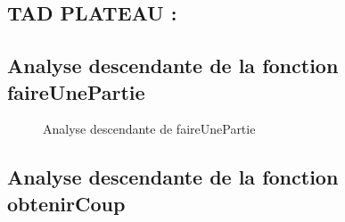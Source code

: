 \documentclass{article}
\begin{document}
\subsection{TAD PLATEAU :}



\subsection{Analyse descendante de la fonction faireUnePartie}

\begin{figure}[H]
    \caption{Analyse descendante de faireUnePartie}
    \label{un-identifiant1}
\end{figure}

\subsection{Analyse descendante de la fonction obtenirCoup}
\end{document}
